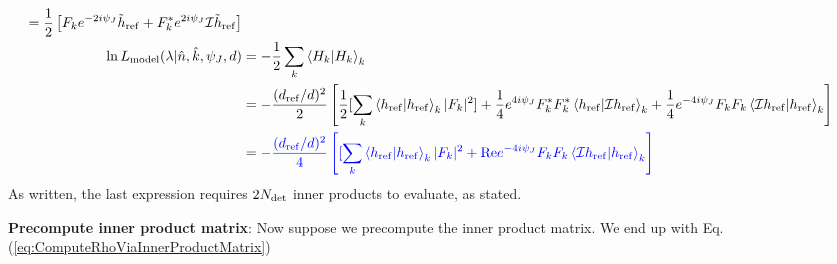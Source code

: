 \documentclass[twocolumn,prd,nofootinbib]{revtex4}
\newcommand\ForRichardOnly[1]{}
\newcommand\Y[1]{Y^{(#1)}{}}
\newcommand\qmstateproduct[2]{\left\langle#1|#2\right\rangle}
\begin{document}
\begin{widetext}
\begin{itemize}
\begin{align}
   = \frac{1}{2}\left[
   F_k e^{-2i\psi_J} \tilde{h}_{\rm ref} +F_k^* e^{2i\psi_J}{\cal I}\tilde{h}_{\rm ref}
  \right] \\
\ln L_{\rm model}(\lambda|\hat{n},\hat{k},\psi_J,d) &= -\frac{1}{2} \sum_k\qmstateproduct{H_k}{H_k}_k 
 \\
&= -\frac{(d_{\rm ref}/d)^2}{2}
\left[ \frac{1}{2} [ \sum_k \qmstateproduct{h_{\rm    ref}}{h_{\rm ref}}_k |F_k |^2 ]
 +\frac{1}{4} e^{4i\psi_J} F_k^* F_k^* \qmstateproduct{h_{\rm ref}}{{\cal I}h_{\rm ref}}_k
 + \frac{1}{4} e^{-4i\psi_J} F_k F_k \qmstateproduct{{\cal I} h_{\rm ref}}{h_{\rm ref}}_k 
\right] \\
&= 
{\color{blue}
-\frac{(d_{\rm ref}/d)^2}{4}
\left[  [ \sum_k \qmstateproduct{h_{\rm    ref}}{h_{\rm ref}}_k|F_k|^2 
 + \text{Re} e^{-4i\psi_J} F_k F_k \qmstateproduct{{\cal I} h_{\rm ref}}{h_{\rm ref}}_k 
\right]
}
\end{align}
As written, the last expression requires $2N_{\rm det}$ inner products to evaluate, as stated.  

\noindent \textbf{Precompute inner product matrix}: Now suppose we precompute the inner product matrix.  We end up with 
Eq. (\ref{eq:ComputeRhoViaInnerProductMatrix})

\end{itemize}

\ForRichardOnly{
\noindent \textbf{Marginalization scheme}: We want to evaluate $L_{\rm red} \equiv \int p(\theta)L(\lambda,\theta)$:

\begin{itemize}
\item \emph{Easy extrinsic first}: Marginalize over $t,d$ and perhaps $\psi_J$ first: these require no $O(N)$
  operations.  For example, in the first case $L_{\rm model}=-\rho^2/2$ scales trivially as $1/d^2$.

I recommend doing this 1d or 2d integral with raw quadrature -- particularly the 1d time case, which requires some care.

\begin{shaded}
Since sky location and emission direction are fixed, we can preprocess and scale $Q_k$ and $P_k$ by their fixed
prefactors, generating short fiducial timeseries (only needed over the window time)
\begin{eqnarray}
\bar{Q}(t) \equiv  \sum_{k,lm}(F_k(-\hat{k}) \Y{-2}_{lm}(\hat{n}))^* Q_{k,lm}(t-\hat{k}\cdot x_k) \\
\bar{P}(t)\equiv   \sum_{klm} (F_k(-\hat{k}) \Y{-2}_{lm}(\hat{n}) ) P_{k,lm}(t-\hat{k}\cdot x_k)  \\
\ln L_{\rm data}(\lambda|t,\hat{n},\hat{k},\psi_J,d)  = (d_{\rm ref}/d)[e^{+i2\psi_J} \bar{Q}(t)  + e^{+i2\psi_J}
  \bar{Q}(t)] 
\end{eqnarray}
The computation of $\rho^2$ has the form
\begin{eqnarray}
\ln L_{\rm model}  = -\frac{(d_{\rm ref}/d)^2}{2}\left[ A  + B \cos 4(\psi-\psi_0) \right] \\
B = |\sum_k F_k F_k \qmstateproduct{{\cal I}h_{\rm ref}}{h_{\rm ref}}_k|
\end{eqnarray}
The value of $\psi_0$ is unimportant and marginalized away.  


\end{shaded}
\end{itemize}}
\end{widetext}
\end{document}
